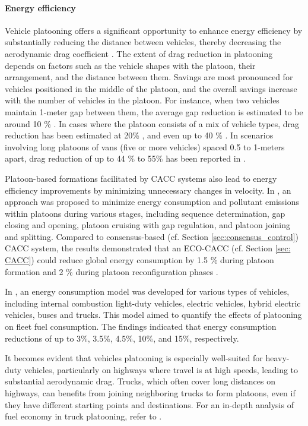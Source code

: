 \paragraph{Energy efficiency} \label{sec: energy_efficiency}
Vehicle platooning offers a significant opportunity to enhance energy efficiency by substantially reducing the distance between vehicles, thereby decreasing the aerodynamic drag coefficient \cite{wadud2016help}. The extent of drag reduction in platooning depends on factors such as the vehicle shapes with the platoon, their arrangement, and the distance between them. Savings are most pronounced for vehicles positioned in the middle of the platoon, and the overall savings increase with the number of vehicles in the platoon. For instance, when two vehicles maintain 1-meter gap between them, the average gap reduction is estimated to be around 10 \% \cite{zhu2011simulation}. In cases where the platoon consists of a mix of vehicle types, drag reduction has been estimated at 20\% \cite{schito2012numerical}, and even up to 40 \% \cite{duan2007effects}. In scenarios involving long platoons of vans (five or more vehicles) spaced 0.5 to 1-meters apart, drag reduction of up to 44 \% to 55\% has been reported in \cite{schito2012numerical}. 

Platoon-based formations facilitated by CACC systems also lead to energy efficiency improvements by minimizing unnecessary changes in velocity. In \cite{wang2017developing}, an approach was proposed to minimize energy consumption and pollutant emissions within platoons during various stages, including sequence determination, gap closing and opening, platoon cruising with gap regulation, and platoon joining and splitting. Compared to consensus-based (cf. Section \ref{sec:consensus_control}) CACC system, the results demonstrated that an ECO-CACC (cf. Section \ref{sec: CACC}) could reduce global energy consumption by 1.5 \% during platoon formation and 2 \% during platoon reconfiguration phases \cite{wang2017developing}.

In \cite{bichiou2020vehicle}, an energy consumption model was developed for various types of vehicles, including internal combustion light-duty vehicles, electric vehicles, hybrid electric vehicles, buses and trucks. This model aimed to quantify the effects of platooning on fleet fuel consumption. The findings indicated that energy consumption reductions of up to 3\%, 3.5\%, 4.5\%, 10\%, and 15\%, respectively. 

It becomes evident that vehicles platooning is especially well-suited for heavy-duty vehicles, particularly on highways where travel is at high speeds, leading to substantial aerodynamic drag. Trucks, which often cover long distances on highways, can benefits from joining neighboring trucks to form platoons, even if they have different starting points and destinations. For an in-depth analysis of fuel economy in truck platooning, refer to \cite{zhang2020fuel}. %

